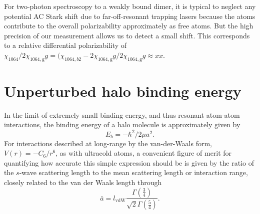 For two-photon spectroscopy to a weakly bound dimer, it is typical to neglect any potential AC Stark shift due to far-off-resonant trapping lasers because the atoms contribute to the overall polarizability approximately as free atoms. But the high precision of our measurement allows us to detect a small shift. This corresponds to a relative differential polarizability of ${\chi_{1064}}/{2\chi_{1064,\text{g}}g}={(\chi_{1064,b2}-2\chi_{1064,\text{g}}g}/{2\chi_{1064,\text{g}}g}\approx xx$.

\section{Unperturbed halo binding energy}
\label{sec:lowE_alt}



In the limit of extremely small binding energy, and thus resonant atom-atom interactions, the binding energy of a halo molecule is approximately given by \cite{kgj06}
\begin{equation}\label{Eq:HaloEnergyNoCorrections}
	E_b=-\hbar^2/2\mu a^2.
\end{equation}
For interactions described at long-range by the van-der-Waals form, $V(r)=-C_6/r^6$, as with ultracold atoms, a convenient figure of merit for quantifying how accurate this simple expression should be is given by the ratio of the $s$-wave scattering length to the mean scattering length or interaction range, closely related to the van der Waals length through \cite{gfl93,cju05}
\begin{equation}\label{Eq:InteractionRangevdW}
  \bar{a}= l_{\mathrm{vdW}}\frac{\Gamma\left(\frac{3}{4}\right)}{\sqrt{2}\Gamma\left(\frac{5}{4}\right)}.
\end{equation}


